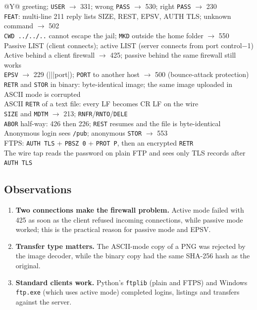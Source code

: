 \documentclass[11pt,a4paper]{article}
\begin{document}
\begin{table}[H]
\centering
\caption{Selected verification checks (all passed)}
\small
\begin{tabularx}{\textwidth}{@{}Y@{}}
 greeting; \texttt{USER} $\rightarrow$ 331; wrong \texttt{PASS} $\rightarrow$ 530; right \texttt{PASS} $\rightarrow$ 230 \\
\texttt{FEAT}: multi-line 211 reply lists SIZE, REST, EPSV, AUTH TLS; unknown command $\rightarrow$ 502 \\
\texttt{CWD ../../..} cannot escape the jail; \texttt{MKD} outside the home folder $\rightarrow$ 550 \\
Passive LIST (client connects); active LIST (server connects from port control$-$1) \\
Active behind a client firewall $\rightarrow$ 425; passive behind the same firewall still works \\
\texttt{EPSV} $\rightarrow$ 229 (|||port|); \texttt{PORT} to another host $\rightarrow$ 500 (bounce-attack protection) \\
\texttt{RETR} and \texttt{STOR} in binary: byte-identical image; the same image uploaded in ASCII mode is corrupted \\
ASCII \texttt{RETR} of a text file: every LF becomes CR LF on the wire \\
\texttt{SIZE} and \texttt{MDTM} $\rightarrow$ 213; \texttt{RNFR}/\texttt{RNTO}/\texttt{DELE} \\
\texttt{ABOR} half-way: 426 then 226; \texttt{REST} resumes and the file is byte-identical \\
Anonymous login sees \texttt{/pub}; anonymous \texttt{STOR} $\rightarrow$ 553 \\
FTPS: \texttt{AUTH TLS} + \texttt{PBSZ 0} + \texttt{PROT P}, then an encrypted \texttt{RETR} \\
The wire tap reads the password on plain FTP and sees only TLS records after \texttt{AUTH TLS} \\ \bottomrule
\end{tabularx}
\end{table}

\subsection{Observations}
\begin{enumerate}[leftmargin=2em]
    \item \textbf{Two connections make the firewall problem.} Active mode failed with 425 as soon as the client refused incoming connections, while passive mode worked; this is the practical reason for passive mode and EPSV.
    \item \textbf{Transfer type matters.} The ASCII-mode copy of a PNG was rejected by the image decoder, while the binary copy had the same SHA-256 hash as the original.
    \item \textbf{Standard clients work.} Python's \texttt{ftplib} (plain and FTPS) and Windows \texttt{ftp.exe} (which uses active mode) completed logins, listings and transfers against the server.
\end{enumerate}
\end{document}
